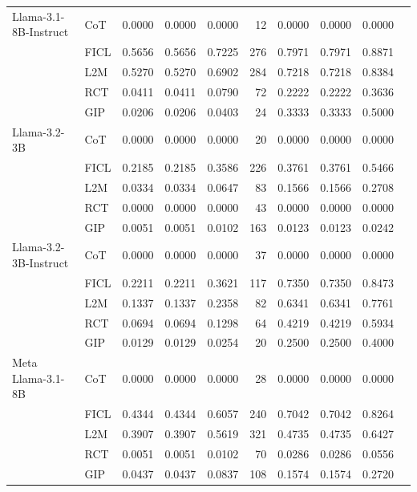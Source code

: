 \documentclass[conference]{IEEEtran}
\begin{document}
\begin{longtable}{p{3.5cm} l r r r r r r r r}
Llama-3.1-8B-Instruct     & CoT  & 0.0000 & 0.0000 & 0.0000 & 12  & 0.0000 & 0.0000 & 0.0000 \\
                          & FICL & 0.5656 & 0.5656 & 0.7225 & 276 & 0.7971 & 0.7971 & 0.8871 \\
                          & L2M  & 0.5270 & 0.5270 & 0.6902 & 284 & 0.7218 & 0.7218 & 0.8384 \\
                          & RCT  & 0.0411 & 0.0411 & 0.0790 & 72  & 0.2222 & 0.2222 & 0.3636 \\
                          & GIP  & 0.0206 & 0.0206 & 0.0403 & 24  & 0.3333 & 0.3333 & 0.5000 \\
Llama-3.2-3B              & CoT  & 0.0000 & 0.0000 & 0.0000 & 20  & 0.0000 & 0.0000 & 0.0000 \\
                          & FICL & 0.2185 & 0.2185 & 0.3586 & 226 & 0.3761 & 0.3761 & 0.5466 \\
                          & L2M  & 0.0334 & 0.0334 & 0.0647 & 83  & 0.1566 & 0.1566 & 0.2708 \\
                          & RCT  & 0.0000 & 0.0000 & 0.0000 & 43  & 0.0000 & 0.0000 & 0.0000 \\
                          & GIP  & 0.0051 & 0.0051 & 0.0102 & 163 & 0.0123 & 0.0123 & 0.0242 \\
Llama-3.2-3B-Instruct     & CoT  & 0.0000 & 0.0000 & 0.0000 & 37  & 0.0000 & 0.0000 & 0.0000 \\
                          & FICL & 0.2211 & 0.2211 & 0.3621 & 117 & 0.7350 & 0.7350 & 0.8473 \\
                          & L2M  & 0.1337 & 0.1337 & 0.2358 & 82  & 0.6341 & 0.6341 & 0.7761 \\
                          & RCT  & 0.0694 & 0.0694 & 0.1298 & 64  & 0.4219 & 0.4219 & 0.5934 \\
                          & GIP  & 0.0129 & 0.0129 & 0.0254 & 20  & 0.2500 & 0.2500 & 0.4000 \\
Meta Llama-3.1-8B         & CoT  & 0.0000 & 0.0000 & 0.0000 & 28  & 0.0000 & 0.0000 & 0.0000 \\
                          & FICL & 0.4344 & 0.4344 & 0.6057 & 240 & 0.7042 & 0.7042 & 0.8264 \\
                          & L2M  & 0.3907 & 0.3907 & 0.5619 & 321 & 0.4735 & 0.4735 & 0.6427 \\
                          & RCT  & 0.0051 & 0.0051 & 0.0102 & 70  & 0.0286 & 0.0286 & 0.0556 \\
                          & GIP  & 0.0437 & 0.0437 & 0.0837 & 108 & 0.1574 & 0.1574 & 0.2720 \\

\end{longtable}
\end{document}
